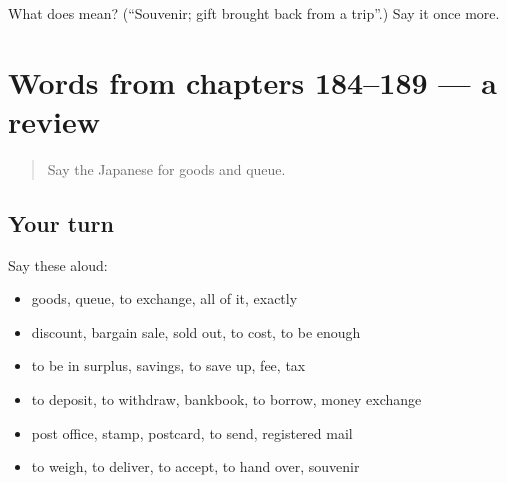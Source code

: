 \begin{tcolorbox}[breakable,colback=teal!4,colframe=teal!35!black,title={Before you move on}]
What does  mean? (\textquotedblleft{}Souvenir; gift brought back from a trip\textquotedblright{}.) Say it once more.
\end{tcolorbox}
\section[(dialogue)]{Words from chapters 184–189 — a review}

\label{lesson:JA-R189-review-184-189}



\begin{quote}
Say the Japanese for goods and queue.
\end{quote}

\subsection*{Your turn}
Say these aloud:

\begin{itemize}
\raggedright
  \item goods, queue, to exchange, all of it, exactly
  \item discount, bargain sale, sold out, to cost, to be enough
  \item to be in surplus, savings, to save up, fee, tax
  \item to deposit, to withdraw, bankbook, to borrow, money exchange
  \item post office, stamp, postcard, to send, registered mail
  \item to weigh, to deliver, to accept, to hand over, souvenir
\end{itemize}

